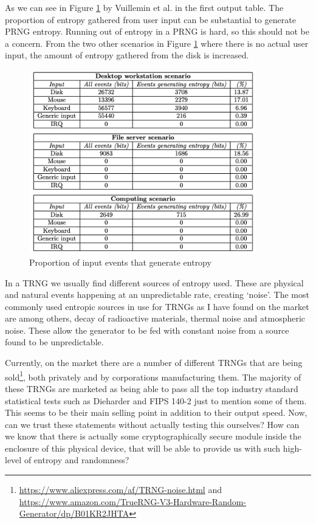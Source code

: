 \documentclass[]{final_report}
\begin{document}
\par{As we can see in Figure \ref{fig:TableA} by Vuillemin et al. \cite{Vuillemin:2012} in the first output table. The proportion of entropy gathered from user input can be substantial to generate PRNG entropy. Running out of entropy in a PRNG is hard, so this should not be a concern. From the two other scenarios in Figure \ref{fig:TableA} where there is no actual user input, the amount of entropy gathered from the disk is increased.}

\begin{figure}[h!]
\begin{center}
\includegraphics[height=8cm]{TableA}
\caption{Proportion of input events that generate entropy\cite{Vuillemin:2012}}
\label{fig:TableA}
\end{center}
\end{figure}

\par{In a TRNG we usually find different sources of entropy used. These are physical and natural events happening at an unpredictable rate, creating ‘noise’. The most commonly used entropic sources in use for TRNGs as I have found on the market are among others, decay of radioactive materials\cite{Rohe:2003}, thermal noise\cite{Rohe:2003} and atmospheric noise\cite{Jun:1999}. These allow the generator to be fed with constant noise from a source found to be unpredictable.}

\par{Currently, on the market there are a number of different TRNGs that are being sold\footnote{\url{https://www.aliexpress.com/af/TRNG-noise.html} and \url{https://www.amazon.com/TrueRNG-V3-Hardware-Random-Generator/dp/B01KR2JHTA}}, both privately and by corporations manufacturing them. The majority of these TRNGs are marketed as being able to pass all the top industry standard statistical tests such as Dieharder and FIPS 140-2 just to mention some of them. This seems to be their main selling point in addition to their output speed. Now, can we trust these statements without actually testing this ourselves? How can we know that there is actually some cryptographically secure module inside the enclosure of this physical device, that will be able to provide us with such high- level of entropy and randomness?}
\end{document}
